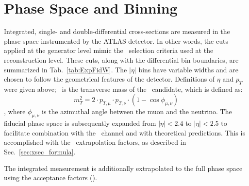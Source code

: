 \section{Phase Space and Binning}
\label{method:fid:space}
Integrated, single- and double-differential cross-sections are measured in the phase space instrumented by the ATLAS detector. In other words, the cuts applied at the generator level mimic the \Wmn\ selection criteria used at the reconstruction level. These cuts, along with the differential bin boundaries, are summarized in Tab.~\ref{tab:ExpFidW}. The $|\eta|$ bins have variable widths and are chosen to follow the geometrical features of the detector. Definitions of $\eta$ and $p_{T}$ were given above; \mt\ is the transverse mass of the \Wboson\ candidate, which is defined as:
$$m_{T}^2 = 2 \cdot p_{T, \mu} \cdot p_{T, \nu} \cdot (1 - \cos\phi_{\mu, \nu})$$
, where $\phi_{\mu, \nu}$ is the azimuthal angle between the muon and the neutrino.
The fiducial phase space is subsequently expanded from $|\eta|<2.4$ to $|\eta|<2.5$ to facilitate combination with the \Wen\ channel and with theoretical predictions. This is accomplished with the \E\ extrapolation factors, as described in Sec.~\ref{sec:xsec_formula}.

The integrated measurement is additionally extrapolated to the full phase space using the acceptance factors (\A).

